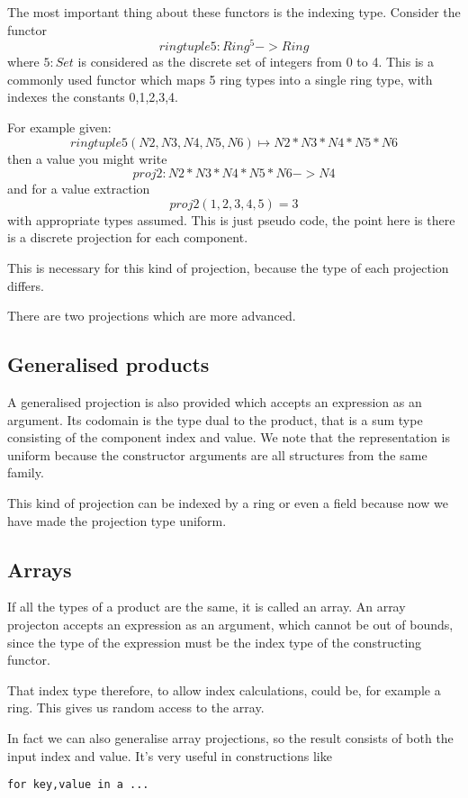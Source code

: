 The most important thing about these functors is the indexing type.
Consider the functor
$$ringtuple5: Ring ^ 5 -> Ring$$
where $5:Set$ is considered as the discrete set of integers from 0 to 4.
This is a commonly used functor which maps 5 ring types into a single ring type,
with indexes the constants 0,1,2,3,4.

For example given:
$$ringtuple5 (N2, N3, N4, N5, N6) \mapsto N2 * N3 * N4 * N5 * N6$$
then  a value you might write
$$proj2: N2 * N3 * N4 * N5 * N6 -> N4$$
and for a value extraction
$$proj2 (1,2,3,4,5) = 3$$
with appropriate types assumed. This is just pseudo code, the point
here is there is a discrete projection for each component.

This is necessary for this kind of projection, because the type of each
projection differs.

There are two projections which are more advanced.

\subsection{Generalised products}
A generalised projection is also provided which accepts an
expression as an argument. Its codomain is the type dual
to the product, that is a sum type consisting of the component
index and value.  We note that the representation is uniform because
the constructor arguments are all structures from the same family.

This kind of projection can be indexed by a ring or even a field
because now we have made the projection type uniform.

\subsection{Arrays}
If all the types of a product are the same, it is called an array.
An array projecton accepts an expression as an argument, which cannot
be out of bounds, since the type of the expression must be the index
type of the constructing functor.

That index type therefore, to allow index calculations, could be,
for example a ring. This gives us random access to the array.
 
In fact we can also generalise array projections, so the result
consists of both the input index and value. It's very useful
in constructions like
\begin{verbatim}
for key,value in a ...
\end{verbatim}

